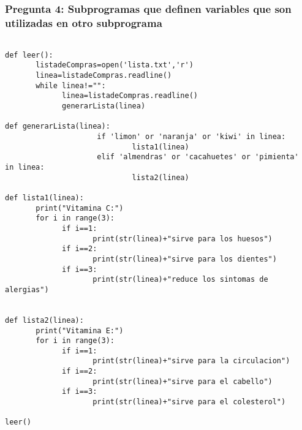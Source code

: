 \subsubsection{Pregunta 4: Subprogramas que definen variables que son utilizadas en otro subprograma}

\begin{verbatim}

def leer():
       listadeCompras=open('lista.txt','r')
       linea=listadeCompras.readline()
       while linea!="":
             linea=listadeCompras.readline()
             generarLista(linea)
             
def generarLista(linea):
                     if 'limon' or 'naranja' or 'kiwi' in linea:
                             lista1(linea)
                     elif 'almendras' or 'cacahuetes' or 'pimienta'  in linea:
                             lista2(linea)
                                      
def lista1(linea):
       print("Vitamina C:")
       for i in range(3):
             if i==1:
                    print(str(linea)+"sirve para los huesos")
             if i==2:
                    print(str(linea)+"sirve para los dientes")
             if i==3:
                    print(str(linea)+"reduce los sintomas de alergias")
               

def lista2(linea):
       print("Vitamina E:")
       for i in range(3):
             if i==1:
                    print(str(linea)+"sirve para la circulacion")
             if i==2:
                    print(str(linea)+"sirve para el cabello")
             if i==3:
                    print(str(linea)+"sirve para el colesterol")
                        
leer()

\end{verbatim}
